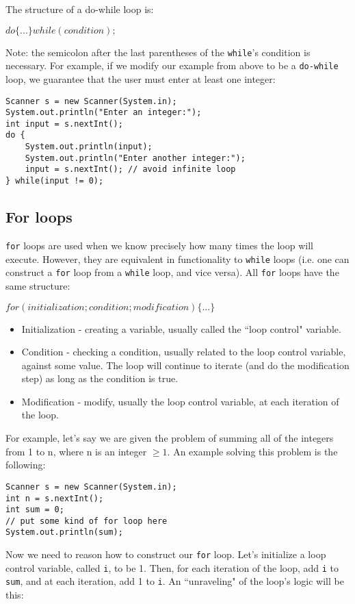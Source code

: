 \par The structure of a do-while loop is:
\begin{center}
$do \{ ... \} while(condition);$
\end{center}
Note: the semicolon after the last parentheses of the \verb|while|'s condition is necessary. For example, if we modify our example from above to be a \verb|do-while| loop, we guarantee that the user must enter at least one integer:
\begin{lstlisting}
Scanner s = new Scanner(System.in);
System.out.println("Enter an integer:");
int input = s.nextInt();
do {
	System.out.println(input);
	System.out.println("Enter another integer:");
	input = s.nextInt(); // avoid infinite loop
} while(input != 0);
\end{lstlisting}

\subsection{For loops}
\verb|for| loops are used when we know precisely how many times the loop will execute. However, they are equivalent in functionality to \verb|while| loops (i.e. one can construct a \verb|for| loop from a \verb|while| loop, and vice versa). All \verb|for| loops have the same structure:
\begin{center}
$for(initialization; condition; modification) \{...\}$
\end{center}
\begin{itemize}
\item Initialization - creating a variable, usually called the ``loop control" variable.
\item Condition - checking a condition, usually related to the loop control variable, against some value. The loop will continue to iterate (and do the modification step) as long as the condition is true.
\item Modification - modify, usually the loop control variable, at each iteration of the loop.
\end{itemize}
For example, let's say we are given the problem of summing all of the integers from 1 to n, where n is an integer $\ge 1$. An example solving this problem is the following:
\begin{lstlisting}
Scanner s = new Scanner(System.in);
int n = s.nextInt();
int sum = 0;
// put some kind of for loop here
System.out.println(sum);
\end{lstlisting}
Now we need to reason how to construct our \verb|for| loop. Let's initialize a loop control variable, called \verb|i|, to be 1. Then, for each iteration of the loop, add \verb|i| to \verb|sum|, and at each iteration, add 1 to \verb|i|. An ``unraveling" of the loop's logic will be this:

